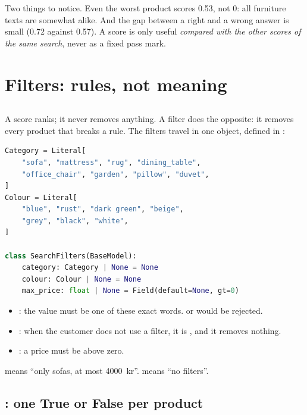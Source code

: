 \documentclass[11pt]{article}
\begin{document}
Two things to notice. Even the worst product scores 0.53, not 0: all
furniture texts are somewhat alike. And the gap between a right and a
wrong answer is small (0.72 against 0.57). A score is only useful
\emph{compared with the other scores of the same search}, never as a
fixed pass mark.

\section{Filters: rules, not meaning}
\label{sec:filters}

\subsection{}

A score ranks; it never removes anything. A filter does the opposite:
it removes every product that breaks a rule. The filters travel in one
object, defined in :
\begin{lstlisting}[language=Python]
Category = Literal[
    "sofa", "mattress", "rug", "dining_table",
    "office_chair", "garden", "pillow", "duvet",
]
Colour = Literal[
    "blue", "rust", "dark green", "beige",
    "grey", "black", "white",
]

class SearchFilters(BaseModel):
    category: Category | None = None
    colour: Colour | None = None
    max_price: float | None = Field(default=None, gt=0)
\end{lstlisting}
\begin{itemize}[leftmargin=1.4em, itemsep=2pt]
\item {}: the value must be one of these exact words.
   or  would be rejected.
\item {}: when the customer does not use a filter, it
  is , and it removes nothing.
\item {}: a price must be above zero.
\end{itemize}
 means ``only
sofas, at most 4000~kr''.  means ``no filters''.

\subsection{: one True or False per product}
\end{document}
